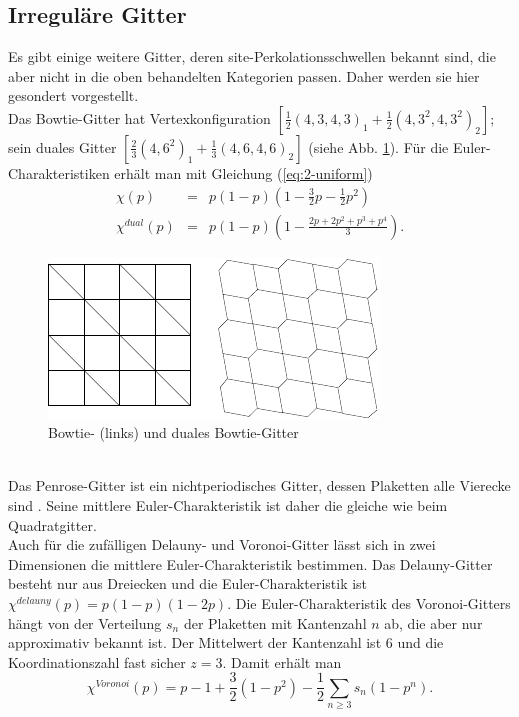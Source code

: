 \subsection{Irregul\"are Gitter}
Es gibt einige weitere Gitter, deren site-Perkolationsschwellen bekannt sind, die aber nicht in die oben behandelten Kategorien passen. Daher werden sie hier gesondert vorgestellt.\\
Das Bowtie-Gitter hat Vertexkonfiguration $\left[ \frac{1}{2}(4,3,4,3)_1+\frac{1}{2}(4,3^2,4,3^2)_2 \right]$; sein duales Gitter $\left[ \frac{2}{3}(4,6^2)_1+\frac{1}{3}(4,6,4,6)_2 \right]$ (siehe Abb. \ref{fig:bowtie}). F\"ur die Euler-Charakteristiken erh\"alt man mit Gleichung (\ref{eq:2-uniform})
\begin{eqnarray}
  \chi(p) & = &p(1-p)\left(1-\frac{3}{2}p-\frac{1}{2}p^2 \right)\\
 \chi^{dual}(p)& = & p(1-p)\left(1-\frac{2p+2p^2+p^3+p^4}{3} \right).
\end{eqnarray}
\begin{figure}[bp]
  \centering
  \includegraphics{./Schranken-figs/bowtie}
  \caption{Bowtie- (links) und duales Bowtie-Gitter}
  \label{fig:bowtie}
\end{figure}
\\Das Penrose-Gitter ist ein nichtperiodisches Gitter, dessen Plaketten alle Vierecke sind \cite{Gruenbaum:86}. Seine mittlere Euler-Charakteristik ist daher die gleiche wie beim Quadratgitter.\\
Auch f\"ur die zuf\"alligen Delauny- und Voronoi-Gitter \cite{Weygaert:91} l\"asst sich in zwei Dimensionen die mittlere Euler-Charakteristik bestimmen. Das Delauny-Gitter besteht nur aus Dreiecken und die Euler-Charakteristik ist $\chi^{delauny}(p)=p(1-p)(1-2p)$. Die Euler-Charakteristik des Voronoi-Gitters h\"angt von der Verteilung $s_n$ der Plaketten mit Kantenzahl $n$ ab, die aber nur approximativ bekannt ist. Der Mittelwert der Kantenzahl ist $6$ und die Koordinationszahl fast sicher $z=3$. Damit erh\"alt man 
\begin{equation}
\label{eq:voronoi}
  \chi^{Voronoi}(p)=p-1+\frac{3}{2}(1-p^2)-\frac{1}{2}\sum_{n\geq 3}s_n(1-p^n).
\end{equation}
